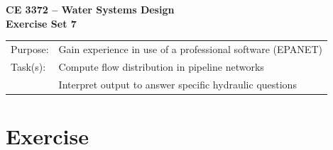 \documentclass[12pt]{article}
\begin{document}
\begin{center}
{\textbf{{ CE 3372 -- Water Systems Design} \\ {Exercise Set 7}}}
\end{center}
\begingroup
\begin{tabular}{p{1in} p{5in}}
Purpose: & Gain experience in use of a professional software (EPANET)  \\
Task(s): & Compute flow distribution in pipeline networks\\
~ & Interpret output to answer specific hydraulic questions \\

\end{tabular}
\endgroup
\section*{\small{Exercise}}
\end{document}
